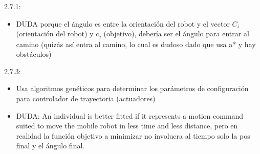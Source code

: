 2.7.1:
\begin{itemize}
\item DUDA porque el ángulo es entre la orientación del robot y el vector $C_i$ (orientación del robot) y $c_j$ (objetivo), debería ser el ángulo para entrar al camino (quizás así entra al camino, lo cual es dudoso dado que usa a* y hay obstáculos)
\end{itemize}

2.7.3:
\begin{itemize}
\item Usa algoritmos genéticos para determinar los parámetros de configuración para controlador de trayectoria (actuadores)
\item DUDA: An individual is better fitted if it represents a motion command suited to move the mobile robot in less time and less distance, pero en realidad la función objetivo a minimizar no involucra al tiempo solo la pos final y el ángulo final.
\end{itemize}


